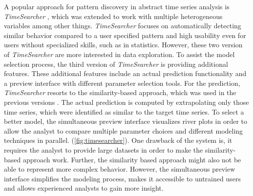 \documentclass[electronic]{vgtc}             %
\begin{document}
A popular approach for pattern discovery in abstract time series analysis is \textit{TimeSearcher} \cite{Hochheiser:2004}, which was extended \cite{buono:2005} to work with multiple heterogeneous variables among other things.
\textit{TimeSearcher} focuses on automatically detecting similar behavior compared to a user specified pattern and high usability even for users without specialized skills, such as in statistics.
However, these two version of \textit{TimeSearcher} are more interested in data exploration.
To assist the model selection process, the third version of \textit{TimeSearcher} \cite{buono:2007} is providing additional features.  
These additional features include an actual prediction functionality and a preview interface with different parameter selection tools.
For the prediction, \textit{TimeSearcher} resorts to the similarity-based approach, which was used in the previous versions \cite{buono:2005, Hochheiser:2004}.
The actual prediction is computed by extrapolating only those time series, which were identified as similar to the target time series.
To select a better model, the simultaneous preview interface visualizes river plots in order to allow the analyst to compare multiple parameter choices and different modeling techniques in parallel. (\autoref{fig:timesearcher}).
One drawback of the system is, it requires the analyst to provide large datasets in order to make the similarity-based approach work.
Further, the similarity based approach might also not be able to represent more complex behavior.
However, the simultaneous preview interface simplifies the modeling process, makes it accessible to untrained users and allows experienced analysts to gain more insight.
\end{document}
